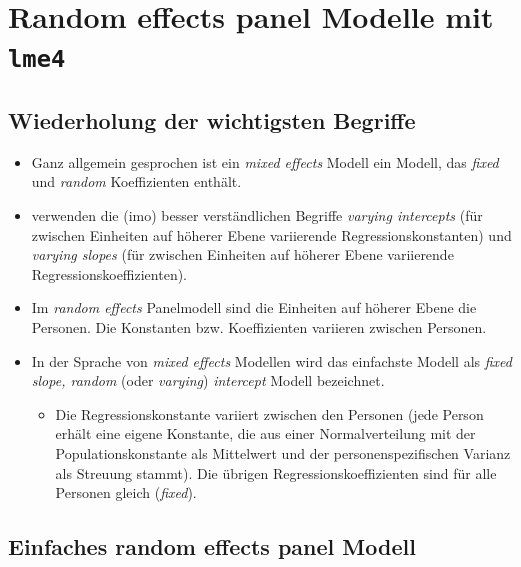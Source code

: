 \documentclass[
]{book}
\providecommand{\tightlist}{%
  \setlength{\itemsep}{0pt}\setlength{\parskip}{0pt}}
\begin{document}
\hypertarget{random-effects-panel-modelle-mit-lme4}{%
\section{\texorpdfstring{Random effects panel Modelle mit \texttt{lme4}}{Random effects panel Modelle mit lme4}}\label{random-effects-panel-modelle-mit-lme4}}

\hypertarget{wiederholung-der-wichtigsten-begriffe}{%
\subsection*{Wiederholung der wichtigsten Begriffe}\label{wiederholung-der-wichtigsten-begriffe}}

\begin{itemize}
\tightlist
\item
  Ganz allgemein gesprochen ist ein \emph{mixed effects} Modell ein Modell, das \emph{fixed} und \emph{random} Koeffizienten enthält.
\item
  \citet{gelmanDataAnalysisUsing2006} verwenden die (imo) besser verständlichen Begriffe \emph{varying intercepts} (für zwischen Einheiten auf höherer Ebene variierende Regressionskonstanten) und \emph{varying slopes} (für zwischen Einheiten auf höherer Ebene variierende Regressionskoeffizienten).
\item
  Im \emph{random effects} Panelmodell sind die Einheiten auf höherer Ebene die Personen. Die Konstanten bzw. Koeffizienten variieren zwischen Personen.
\item
  In der Sprache von \emph{mixed effects} Modellen wird das einfachste Modell als \emph{fixed slope, random} (oder \emph{varying}) \emph{intercept} Modell bezeichnet.

  \begin{itemize}
  \tightlist
  \item
    Die Regressionskonstante variiert zwischen den Personen (jede Person erhält eine eigene Konstante, die aus einer Normalverteilung mit der Populationskonstante als Mittelwert und der personenspezifischen Varianz als Streuung stammt).
    Die übrigen Regressionskoeffizienten sind für alle Personen gleich (\emph{fixed}).
  \end{itemize}
\end{itemize}

\hypertarget{einfaches-random-effects-panel-modell}{%
\subsection*{Einfaches random effects panel Modell}\label{einfaches-random-effects-panel-modell}}
\end{document}
